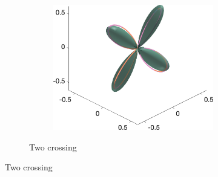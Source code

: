 \begin{figure}
\begin{subfigure}[]{\textwidth}
\begin{subfigure}[]{0.32\textwidth}
    \includegraphics[width=\textwidth]{figures/frf_experiment/twoperp_fod_3D_b_3000n_4}
  \end{subfigure}
  \caption{Two crossing}
  \end{subfigure}


\end{figure}
